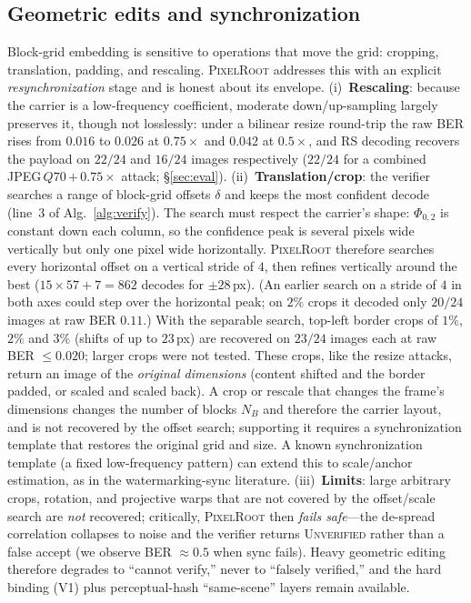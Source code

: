 \documentclass[journal]{IEEEtran}
\newcommand{\pr}{\textup{\textsc{PixelRoot}}}
\begin{document}
\subsection{Geometric edits and synchronization}\label{sec:geom}
Block-grid embedding is sensitive to operations that move the grid: cropping,
translation, padding, and rescaling. \pr{} addresses this with an explicit
\emph{resynchronization} stage and is honest about its envelope. (i)~\textbf{Rescaling}:
because the carrier is a low-frequency coefficient, moderate down/up-sampling
largely preserves it, though not losslessly: under a bilinear resize round-trip
the raw BER rises from $0.016$ to $0.026$ at $0.75\times$ and $0.042$ at
$0.5\times$, and RS decoding recovers the payload on $22/24$ and $16/24$ images
respectively ($22/24$ for a combined JPEG\,$Q70$\,$+$\,$0.75\times$ attack;
\S\ref{sec:eval}). (ii)~\textbf{Translation/crop}: the verifier searches a
range of block-grid offsets $\delta$ and keeps the most confident decode
(line~3 of Alg.~\ref{alg:verify}). The search must respect the carrier's shape:
$\Phi_{0,2}$ is constant down each column, so the confidence peak is several
pixels wide vertically but only one pixel wide horizontally. \pr{} therefore
searches every horizontal offset on a vertical stride of $4$, then refines
vertically around the best ($15\times57+7=862$ decodes for $\pm28$\,px). (An
earlier search on a stride of $4$ in both axes could step over the horizontal
peak; on $2\%$ crops it decoded only $20/24$ images at raw BER $0.11$.) With the
separable search, top-left border crops of $1\%$, $2\%$ and $3\%$ (shifts of up
to $23$\,px) are recovered on $23/24$ images each at raw BER $\le\!0.020$; larger
crops were not tested. These crops, like the resize attacks, return an image of
the \emph{original dimensions} (content shifted and the border padded, or scaled
and scaled back). A crop or rescale that changes the frame's dimensions changes
the number of blocks $N_B$ and therefore the carrier layout, and is not
recovered by the offset search; supporting it requires a synchronization
template that restores the original grid and size. A known synchronization
template (a fixed low-frequency pattern) can extend this to scale/anchor
estimation, as in the watermarking-sync literature. (iii)~\textbf{Limits}:
large arbitrary crops, rotation, and projective warps that are not covered by
the offset/scale search are \emph{not} recovered; critically, \pr{} then
\emph{fails safe}---the de-spread correlation collapses to noise and the verifier
returns \textsc{Unverified} rather than a false accept (we observe BER
$\approx\!0.5$ when sync fails). Heavy geometric editing therefore degrades to
``cannot verify,'' never to ``falsely verified,'' and the hard binding (V1)
plus perceptual-hash ``same-scene'' layers remain available.
\end{document}
